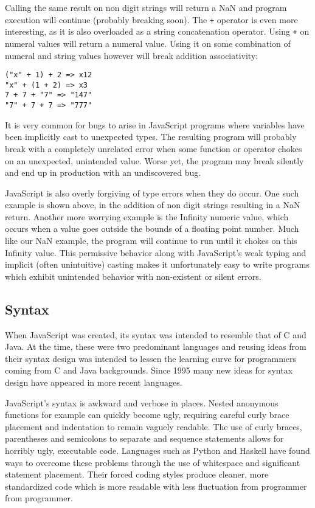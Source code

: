 \noindent Calling the same result on non digit strings will return a NaN and
program execution will continue (probably breaking soon). The \verb!+! operator
is even more interesting, as it is also overloaded as a string concatenation
operator. Using \verb!+! on numeral values will return a numeral value. 
Using it on some combination of numeral and string values however will break
addition associativity:

\begin{center}
	\verb!("x" + 1) + 2 => x12! \\
	\verb!"x" + (1 + 2) => x3! \\
	\verb!7 + 7 + "7" => "147"! \\
	\verb!"7" + 7 + 7 => "777"!
\end{center}

\noindent It is very common for bugs to arise in JavaScript programs where
variables have been implicitly cast to unexpected types. The
resulting program will probably break with a completely unrelated error
when some function or operator chokes on an unexpected, unintended value.
Worse yet, the program may break silently and end up in production with 
an undiscovered bug.

JavaScript is also overly forgiving of type errors when they do occur.
One such example is shown above, in the addition of non digit strings
resulting in a NaN return. Another more worrying example is the Infinity
numeric value, which occurs when a value goes outside the bounds of
a floating point number. Much like our NaN example, the program will
continue to run until it chokes on this Infinity value. This permissive
behavior along with JavaScript's weak typing and implicit (often unintuitive)
casting makes it unfortunately easy to write programs which exhibit
unintended behavior with non-existent or silent errors.
 


\subsection{Syntax}
When JavaScript was created, its syntax was intended to resemble that 
of C and Java. At the time, these were two predominant languages and
reusing ideas from their syntax design was intended to lessen the 
learning curve for programmers coming from C and Java backgrounds.
Since 1995 many new ideas for syntax design have appeared in more
recent languages. 

JavaScript's syntax is awkward and verbose in places. Nested 
anonymous functions for example can quickly become ugly, requiring
careful curly brace placement and indentation to remain vaguely
readable. The use of curly braces, parentheses and semicolons to
separate and sequence statements allows for horribly ugly, executable
code. Languages such as Python and Haskell have found ways
to overcome these problems through the use of whitespace and significant
statement placement. Their forced coding styles produce cleaner, more
standardized code which is more readable with less fluctuation from
programmer from programmer. 


